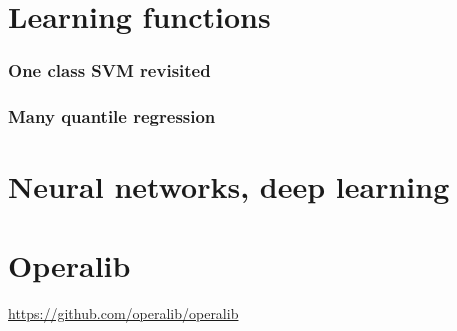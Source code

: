 \section{Learning functions}
\subsubsection{One class SVM revisited}

\subsubsection{Many quantile regression}

\section{Neural networks, deep learning}

\section{Operalib}
\url{https://github.com/operalib/operalib}
